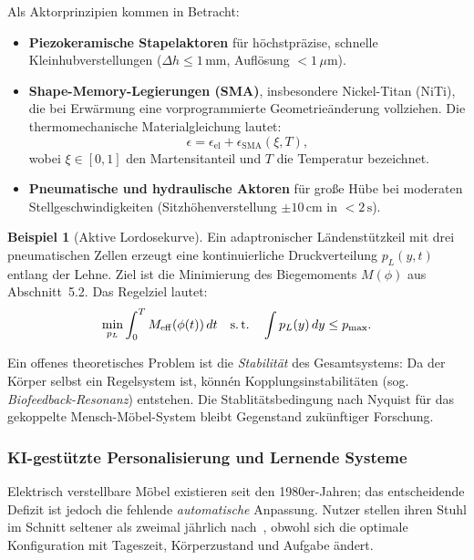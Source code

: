 \documentclass[a4paper,12pt]{article}
\theoremstyle{definition}
\newtheorem{beispiel}{Beispiel}
\begin{document}
Als Aktorprinzipien kommen in Betracht:
\begin{itemize}
	\item \textbf{Piezokeramische Stapelaktoren} f\"{u}r h\"{o}chstpr\"{a}zise, schnelle
	      Kleinhubverstellungen ($\Delta h \leq 1\,\mathrm{mm}$, Aufl\"{o}sung $<1\,\mu\mathrm{m}$).
	\item \textbf{Shape-Memory-Legierungen (SMA)}, insbesondere Nickel-Titan (NiTi),
	      die bei Erw\"{a}rmung eine vorprogrammierte Geometrie\"{a}nderung vollziehen.
	      Die thermomechanische Materialgleichung lautet:
	      \[
	      	\epsilon = \epsilon_{\mathrm{el}} + \epsilon_{\mathrm{SMA}}(\xi, T),
	      \]
	      wobei $\xi \in [0, 1]$ den Martensitanteil und $T$ die Temperatur bezeichnet.
	\item \textbf{Pneumatische und hydraulische Aktoren} f\"{u}r gro\ss{}e H\"{u}be bei
	      moderaten Stellgeschwindigkeiten (Sitzh\"{o}henverstellung $\pm 10\,\mathrm{cm}$
	      in $< 2\,\mathrm{s}$).
\end{itemize}

\begin{beispiel}[Aktive Lordosekurve]
	Ein adaptronischer L\"{a}ndenst\"{u}tzkeil mit drei pneumatischen Zellen erzeugt eine
	kontinuierliche Druckverteilung $p_L(y, t)$ entlang der Lehne. Ziel ist die
	Minimierung des Biegemoments $M(\phi)$ aus Abschnitt~5.2. Das Regelziel lautet:
	\[
		\min_{p_L} \int_0^T M_{\mathrm{eff}}(\phi(t))\,dt
		\quad \text{s.\,t.} \quad
		\int p_L(y)\,dy \leq p_{\max}.
	\]
\end{beispiel}

Ein offenes theoretisches Problem ist die \emph{Stabilit\"{a}t} des Gesamtsystems:
Da der K\"{o}rper selbst ein Regelsystem ist, k\"{o}nn\'{e}n Kopplungsinstabilit\"{a}ten
(sog. \emph{Biofeedback-Resonanz}) entstehen. Die Stablit\"{a}tsbedingung nach Nyquist
f\"{u}r das gekoppelte Mensch-M\"{o}bel-System bleibt Gegenstand zuk\"{u}nftiger Forschung.

\subsubsection{KI-gest\"{u}tzte Personalisierung und Lernende Systeme}

Elektrisch verstellbare M\"{o}bel existieren seit den 1980er-Jahren; das entscheidende
Defizit ist jedoch die fehlende \emph{automatische} Anpassung. Nutzer stellen ihren
Stuhl im Schnitt seltener als zweimal j\"{a}hrlich nach~\cite{ISO9241}, obwohl sich
die optimale Konfiguration mit Tageszeit, K\"{o}rperzustand und Aufgabe \"{a}ndert.
\end{document}

